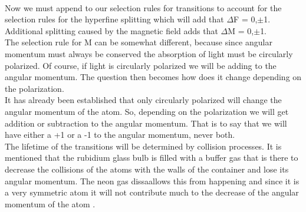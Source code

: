 \documentclass[twocolumn]{article}
\begin{document}
\\
Now we must append to our selection rules for transitions to account for the 
selection rules for the hyperfine splitting which will add that $\Delta$F = 
0,$\pm$1. Additional splitting caused by the magnetic field adds that $\Delta$M 
= 0,$\pm$1.
\\
The selection rule for M can be somewhat different, because since angular 
momentum must always be conserved the absorption of light must be circularly 
polarized. Of course, if light is circularly polarized we will be adding to 
the angular momentum. The question then becomes how does it change depending on 
the polarization.
\\
It has already been established that only circularly polarized will change the 
angular momentum of the atom. So, depending on the polarization we will get 
addition or subtraction to the angular momentum. That is to say that we will 
have either a +1 or a -1 to the angular momentum, never both.
\\
The lifetime of the transitions will be determined by collision processes. 
It is mentioned that the rubidium glass bulb is filled with a buffer gas that 
is there to decrease the collisions of the atoms with the walls of the 
container and lose its angular momentum. The neon gas dissaallows this from 
happening and since it is a very symmetric atom it will not contribute much to 
the decrease of the angular momentum of the atom \cite{ref:1}.
\end{document}
